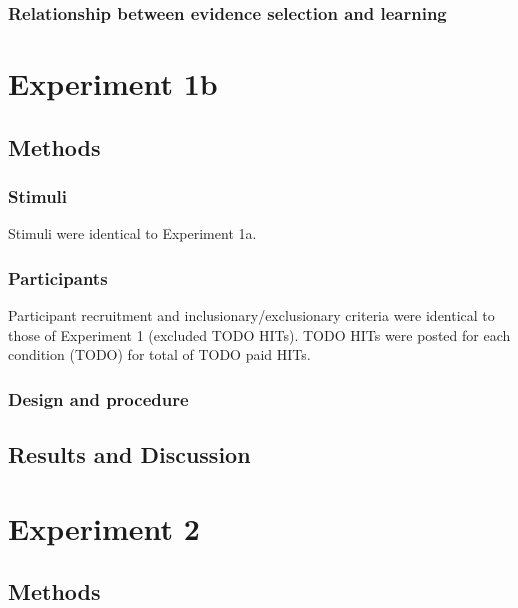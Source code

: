 \documentclass[10pt, letterpaper]{article}
\begin{document}
\subsubsection{Relationship between evidence selection and
learning}\label{relationship-between-evidence-selection-and-learning}

\section{Experiment 1b}\label{experiment-1b}

\subsection{Methods}\label{methods-1}

\subsubsection{Stimuli}\label{stimuli-1}

Stimuli were identical to Experiment 1a.

\subsubsection{Participants}\label{participants-1}

Participant recruitment and inclusionary/exclusionary criteria were
identical to those of Experiment 1 (excluded TODO HITs). TODO HITs were
posted for each condition (TODO) for total of TODO paid HITs.

\subsubsection{Design and procedure}\label{design-and-procedure-1}

\subsection{Results and Discussion}\label{results-and-discussion-1}

\section{Experiment 2}\label{experiment-2}

\subsection{Methods}\label{methods-2}
\end{document}
